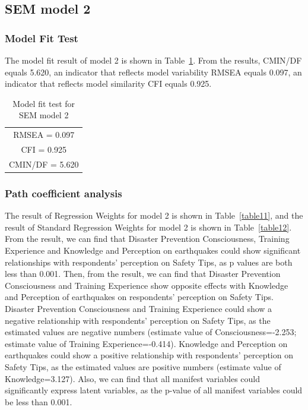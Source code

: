 \subsection{SEM model 2}


\subsubsection{Model Fit Test}
The model fit result of model 2 is shown in Table~\ref{table16}. From the results, CMIN/DF equals 5.620, an indicator that reflects model variability RMSEA equals 0.097, an indicator that reflects model similarity CFI equals 0.925.

\begin{table}[h]
  \caption{Model fit test for SEM model 2}
  \label{table16}
  \centering 
  \begin{tabular}{|c|}
  \hline
  RMSEA = 0.097 \\
  CFI = 0.925 \\
  CMIN/DF = 5.620 \\
  \hline
  \end{tabular}
\end{table}

\subsubsection{Path coefficient analysis}
The result of Regression Weights for model 2 is shown in Table~\ref{table11}, and the result of Standard Regression Weights for model 2 is shown in Table~\ref{table12}. From the result, we can find that Disaster Prevention Consciousness, Training Experience and Knowledge and Perception on earthquakes could show significant relationships with respondents' perception on Safety Tips, as p values are both less than 0.001. Then, from the result, we can find that Disaster Prevention Consciousness and Training Experience show opposite effects with Knowledge and Perception of earthquakes on respondents' perception on Safety Tips.  Disaster Prevention Consciousness and Training Experience could show a negative relationship with respondents' perception on Safety Tips, as the estimated values are negative numbers (estimate value of Consciousness=-2.253; estimate value of Training Experience=-0.414). Knowledge and Perception on earthquakes could show a positive relationship with respondents' perception on Safety Tips, as the estimated values are positive numbers (estimate value of Knowledge=3.127). Also, we can find that all manifest variables could significantly express latent variables, as the p-value of all manifest variables could be less than 0.001. 

